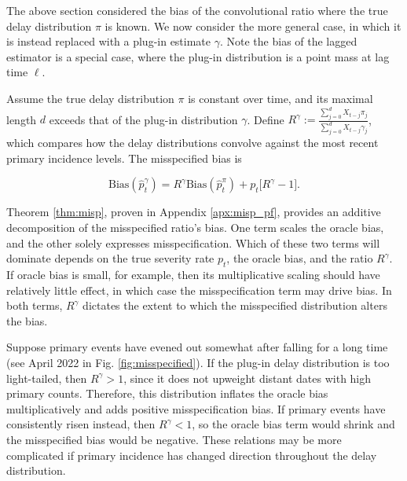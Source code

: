 \documentclass{article}
\begin{document}
The above section considered the bias of the convolutional ratio where the true delay distribution $\pi$ is known. We now consider the more general case, in which it is instead replaced with a plug-in estimate $\gamma$. Note the bias of the lagged estimator is a special case, where the plug-in distribution is a point mass at lag time $\ell$. 

\begin{theorem}\label{thm:misp}
Assume the true delay distribution $\pi $ is constant over time, and its maximal length $d$ exceeds that of the plug-in distribution $\gamma$. 
Define $R^\gamma := \frac{\sum_{j=0}^d X_{t-j}\pi_j}{\sum_{j=0}^d X_{t-j}\gamma_j}$, which compares how the delay distributions convolve against the most recent primary incidence levels. The misspecified bias is

\begin{equation*}%
          \text{Bias}(\hat{p}_t^\gamma) = R^\gamma\text{Bias}(\hat{p}_t^\pi) + p_t\big[ R^\gamma-1\big].
\end{equation*}
\end{theorem}

Theorem \ref{thm:misp}, proven in Appendix \ref{apx:misp_pf}, provides an additive decomposition of the misspecified ratio's bias. One term scales the oracle bias, and the other solely expresses misspecification. Which of these two terms will dominate depends on the true severity rate $p_t$, the oracle bias, and the ratio $R^\gamma$. If oracle bias is small, for example, then its multiplicative scaling should have relatively little effect, in which case the misspecification term may drive bias. In both terms, $R^\gamma$ dictates the extent to which the misspecified distribution alters the bias.

Suppose primary events have evened out somewhat after falling for a long time (see April 2022 in Fig. \ref{fig:misspecified}). If the plug-in delay distribution is too light-tailed, then $R^\gamma>1$, since it does not upweight distant dates with high primary counts. Therefore, this distribution inflates the oracle bias multiplicatively and adds positive misspecification bias. If primary events have consistently risen instead, then $R^\gamma < 1$, so the oracle bias term would shrink and the misspecified bias would be negative. These relations may be more complicated if primary incidence has changed direction throughout the delay distribution.
\end{document}
